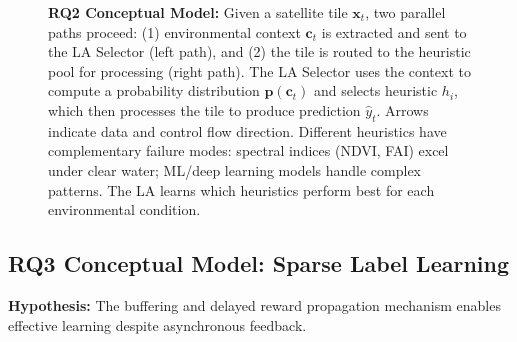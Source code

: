 \documentclass[12pt,oneside]{book}
\begin{document}
\begin{figure}[H]
    \caption{\textbf{RQ2 Conceptual Model:} Given a satellite tile $\mathbf{x}_t$, two parallel paths proceed: (1) environmental context $\mathbf{c}_t$ is extracted and sent to the LA Selector (left path), and (2) the tile is routed to the heuristic pool for processing (right path). The LA Selector uses the context to compute a probability distribution $\mathbf{p}(\mathbf{c}_t)$ and selects heuristic $h_i$, which then processes the tile to produce prediction $\hat{y}_t$. Arrows indicate data and control flow direction. Different heuristics have complementary failure modes: spectral indices (NDVI, FAI) excel under clear water; ML/deep learning models handle complex patterns. The LA learns which heuristics perform best for each environmental condition.}
    \label{fig:rq2-model}
\end{figure}

\subsection{RQ3 Conceptual Model: Sparse Label Learning}
\label{subsec:rq3-model}

\textbf{Hypothesis:} The buffering and delayed reward propagation mechanism enables effective learning despite asynchronous feedback.
\end{document}
